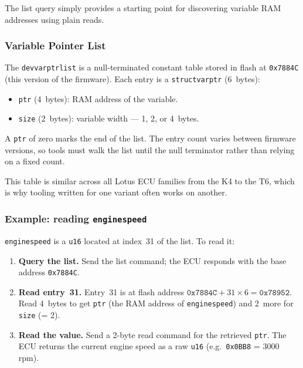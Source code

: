 \documentclass[a4paper,11pt]{article}
\renewcommand{\_}{\oldunderscore\allowbreak}
\begin{document}
The list query simply provides a starting point for discovering variable RAM
addresses using plain reads.

\subsubsection*{Variable Pointer List}

The \texttt{dev\_varptr\_list} is a null-terminated constant table stored in
flash at \texttt{0x7884C} (this version of the firmware). Each entry is a
\texttt{struct\_varptr} (6~bytes):

\begin{itemize}
\item \texttt{ptr} (4~bytes): RAM address of the variable.
\item \texttt{size} (2~bytes): variable width --- 1, 2, or 4~bytes.
\end{itemize}

A \texttt{ptr} of zero marks the end of the list. The entry count varies
between firmware versions, so tools must walk the list until the null
terminator rather than relying on a fixed count.

This table is similar across all Lotus ECU families from the K4 to the T6,
which is why tooling written for one variant often works on another.

\subsubsection*{Example: reading \texttt{engine\_speed\_2}}

\texttt{engine\_speed\_2} is a \texttt{u16} located at index~31 of the list.
To read it:

\begin{enumerate}
\item \textbf{Query the list.} Send the list command; the ECU responds with
      the base address \texttt{0x7884C}.
\item \textbf{Read entry~31.} Entry~31 is at flash address
      $\texttt{0x7884C} + 31 \times 6 = \texttt{0x78952}$. Read 4~bytes to
      get \texttt{ptr} (the RAM address of \texttt{engine\_speed\_2}) and
      2~more for \texttt{size} (= 2).
\item \textbf{Read the value.} Send a 2-byte read command for the retrieved
      \texttt{ptr}. The ECU returns the current engine speed as a raw
      \texttt{u16} (e.g.\ \texttt{0x0BB8} = 3000\,rpm).
\end{enumerate}
\end{document}
